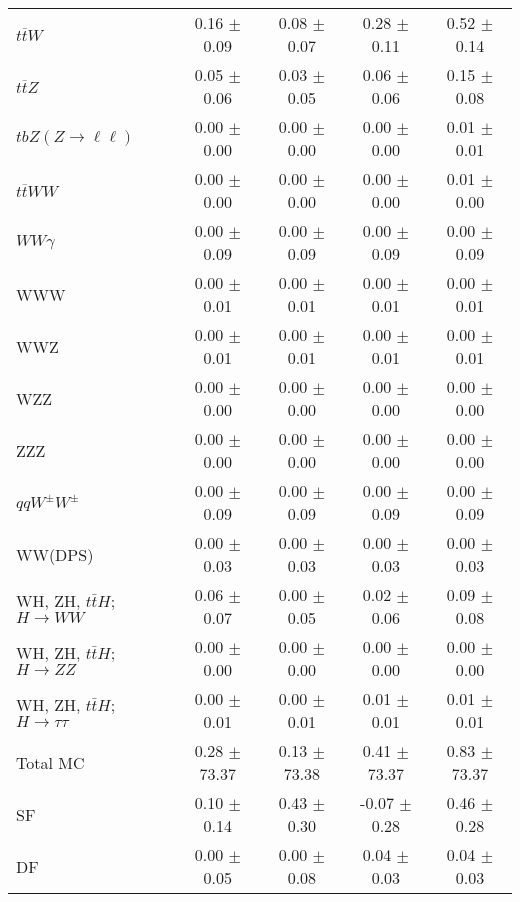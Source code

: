 \begin{tabular}{l|cccc}
                   $t\overline{t}W$ &  0.16 $\pm$  0.09 &  0.08 $\pm$  0.07 &  0.28 $\pm$  0.11 &  0.52 $\pm$  0.14 \\
                   $t\overline{t}Z$ &  0.05 $\pm$  0.06 &  0.03 $\pm$  0.05 &  0.06 $\pm$  0.06 &  0.15 $\pm$  0.08 \\
    $tbZ (Z \rightarrow \ell \ell)$ &  0.00 $\pm$  0.00 &  0.00 $\pm$  0.00 &  0.00 $\pm$  0.00 &  0.01 $\pm$  0.01 \\
                  $t\overline{t}WW$ &  0.00 $\pm$  0.00 &  0.00 $\pm$  0.00 &  0.00 $\pm$  0.00 &  0.01 $\pm$  0.00 \\
                         $WW\gamma$ &  0.00 $\pm$  0.09 &  0.00 $\pm$  0.09 &  0.00 $\pm$  0.09 &  0.00 $\pm$  0.09 \\
                                WWW &  0.00 $\pm$  0.01 &  0.00 $\pm$  0.01 &  0.00 $\pm$  0.01 &  0.00 $\pm$  0.01 \\
                                WWZ &  0.00 $\pm$  0.01 &  0.00 $\pm$  0.01 &  0.00 $\pm$  0.01 &  0.00 $\pm$  0.01 \\
                                WZZ &  0.00 $\pm$  0.00 &  0.00 $\pm$  0.00 &  0.00 $\pm$  0.00 &  0.00 $\pm$  0.00 \\
                                ZZZ &  0.00 $\pm$  0.00 &  0.00 $\pm$  0.00 &  0.00 $\pm$  0.00 &  0.00 $\pm$  0.00 \\
                 $qqW^{\pm}W^{\pm}$ &  0.00 $\pm$  0.09 &  0.00 $\pm$  0.09 &  0.00 $\pm$  0.09 &  0.00 $\pm$  0.09 \\
                            WW(DPS) &  0.00 $\pm$  0.03 &  0.00 $\pm$  0.03 &  0.00 $\pm$  0.03 &  0.00 $\pm$  0.03 \\
WH, ZH, $t\bar{t}H$; $H \rightarrow WW$ &  0.06 $\pm$  0.07 &  0.00 $\pm$  0.05 &  0.02 $\pm$  0.06 &  0.09 $\pm$  0.08 \\
WH, ZH, $t\bar{t}H$; $H \rightarrow ZZ$ &  0.00 $\pm$  0.00 &  0.00 $\pm$  0.00 &  0.00 $\pm$  0.00 &  0.00 $\pm$  0.00 \\
WH, ZH, $t\bar{t}H$; $H \rightarrow \tau\tau$ &  0.00 $\pm$  0.01 &  0.00 $\pm$  0.01 &  0.01 $\pm$  0.01 &  0.01 $\pm$  0.01 \\
\hline\hline
                           Total MC &  0.28 $\pm$ 73.37 &  0.13 $\pm$ 73.38 &  0.41 $\pm$ 73.37 &  0.83 $\pm$ 73.37 \\
\hline
                                 SF &  0.10 $\pm$  0.14 &  0.43 $\pm$  0.30 & -0.07 $\pm$  0.28 &  0.46 $\pm$  0.28 \\
                                 DF &  0.00 $\pm$  0.05 &  0.00 $\pm$  0.08 &  0.04 $\pm$  0.03 &  0.04 $\pm$  0.03 \\

\end{tabular}
